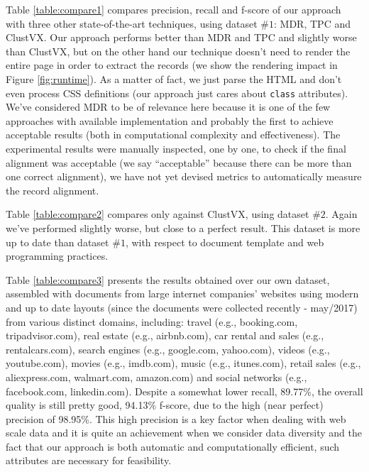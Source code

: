 Table \ref{table:compare1} compares precision, recall and f-score of our
approach with three other state-of-the-art techniques, using dataset $\#1$:
MDR\cite{MDR03}, TPC\cite{TPC09} and ClustVX\cite{grigalis2013towards}.
Our approach performs better than MDR and TPC and slightly worse than ClustVX,
but on the other hand our technique doesn't need to render the entire page in
order to extract the records (we show the rendering impact in Figure
\ref{fig:runtime}).
As a matter of fact, we just parse the HTML and don't even process CSS
definitions (our approach just cares about \texttt{class} attributes).
We've considered MDR to be of relevance here because it is one of the few
approaches with available implementation and probably the first to achieve
acceptable results (both in computational complexity and effectiveness).
The experimental results were manually inspected, one by one, to check if the
final alignment was acceptable (we say ``acceptable'' because there can be more
than one correct alignment), we have not yet devised metrics to automatically
measure the record alignment.

Table \ref{table:compare2} compares only against ClustVX, using dataset $\#2$.
Again we've performed slightly worse, but close to a perfect result. This
dataset is more up to date than dataset $\#1$, with respect to document
template and web programming practices.

Table \ref{table:compare3} presents the results obtained over our own dataset,
assembled with documents from large internet companies' websites using modern
and up to date layouts (since the documents were collected recently - may/2017)
from various distinct domains, including: travel (e.g., booking.com,
tripadvisor.com), real estate (e.g., airbnb.com), car rental and sales (e.g.,
rentalcars.com), search engines (e.g., google.com, yahoo.com), videos (e.g.,
youtube.com), movies (e.g., imdb.com), music (e.g., itunes.com), retail sales
(e.g., aliexpress.com, walmart.com, amazon.com) and social networks (e.g.,
facebook.com, linkedin.com). Despite a somewhat lower recall, 89.77\%, the
overall quality is still pretty good, 94.13\% f-score, due to the high (near
perfect) precision of 98.95\%. This high precision is a key factor when dealing
with web scale data and it is quite an achievement when we consider data
diversity and the fact that our approach is both automatic and computationally
efficient, such attributes are necessary for feasibility.

